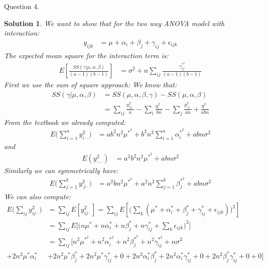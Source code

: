 \documentclass[11pt]{article}
\newtheorem{sol}{Solution}
\begin{document}
Question $4$.
\begin{sol}
	We want to show that for the two way ANOVA model with interaction:
	\begin{align*}
		y_{ijk} &= \mu + \alpha_i + \beta_j  + \gamma_{ij} + \epsilon_{ijk}
	\end{align*}
	The expected mean square for the interaction term is:
	\begin{align*}
		E[\frac{SS(\gamma|\mu, \alpha, \beta)}{(a - 1)(b - 1)}] &= \sigma^2 + n\sum_{ij}\frac{\gamma^{\ast^2}_{ij}}{(a - 1)(b -1)}
	\end{align*}
	First we use the sum of square approach:\vskip 2mm
	We know that:
	\begin{align*}
		SS(\gamma|\mu, \alpha,\beta) &= SS(\mu, \alpha, \beta, \gamma) - SS(\mu, \alpha, \beta)\\
		&= \sum_{ij}\frac{y_{ij\cdot}^2}{n} - \sum_i\frac{y_{i\cdot\cdot}^2}{bn} - \sum_j\frac{y^2_{\cdot j\cdot}}{an} + \frac{y^2_{\cdot\cdot\cdot}}{abn}
	\end{align*} 
	From the textbook we already computed:
	\begin{align*}
		E\Big(\sum_{i = 1}^ay^2_{i\cdot\cdot}\Big) &= ab^2n^2\mu^{\ast^2} + b^2n^2\sum_{i = 1}^a\alpha_i^{\ast^2} + abn\sigma^2
	\end{align*}
	and
	\begin{align*}
		E(y^2_{\cdot\cdot\cdot}) &= a^2b^2n^2\mu^{\ast^2} + abn\sigma^2
	\end{align*}
	Similarly we can symmetrically have:
	\begin{align*}
		E\Big(\sum_{j = 1}^by^2_{\cdot j \cdot}\Big) &= a^2bn^2\mu^{\ast^2} + a^2n^2\sum_{j = 1}^b\beta_j^{\ast^2} + abn\sigma^2
	\end{align*}
	We can also compute:
	\begin{align*}
		E\Big(\sum_{ij}y^2_{ij\cdot}\Big) &= \sum_{ij}E[y^2_{ij\cdot}] = \sum_{ij}E[\Big(\sum_k (\mu^{\ast} + \alpha_i^{\ast} + \beta_j^{\ast} + \gamma^{\ast}_{ij} + \epsilon_{ijk})\Big)^2]\\
		&= \sum_{ij}E\Big[\Big(n\mu^{\ast} + n\alpha_i^{\ast} + n\beta_j^{\ast} + n\gamma^{\ast}_{ij} + \sum_k\epsilon_{ijk}\Big)^2\Big]\\
		&= \sum_{ij}\Big[n^2\mu^{\ast^2} + n^2\alpha_i^{\ast^2} + n^2\beta_j^{\ast^2} + n^2\gamma^{\ast^2}_{ij} + n\sigma^2\\
		+ 2n^2\mu^{\ast}\alpha_i^{\ast} &+ 2n^2\mu^{\ast}\beta^{\ast}_j + 2n^2\mu^{\ast}\gamma^{\ast}_{ij} + 0 + 2n^2\alpha_i^{\ast}\beta_j^{\ast} + 2n^2\alpha_i^{\ast}\gamma_{ij}^{\ast} + 0 + 2n^2\beta_j^{\ast}\gamma_{ij}^{\ast} + 0 + 0\Big]\\

\end{align*}
\end{sol}
\end{document}
